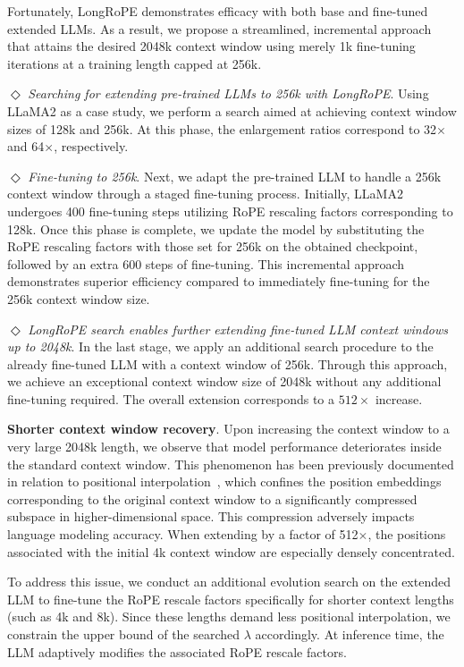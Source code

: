 Fortunately, LongRoPE demonstrates efficacy with both base and fine-tuned extended LLMs. As a result, we propose a streamlined, incremental approach that attains the desired 2048k context window using merely 1k fine-tuning iterations at a training length capped at 256k.

$\Diamond$ \textit{Searching for extending pre-trained LLMs to 256k with LongRoPE}. Using LLaMA2 as a case study, we perform a search aimed at achieving context window sizes of 128k and 256k. At this phase, the enlargement ratios correspond to 32$\times$ and 64$\times$, respectively.

$\Diamond$ \textit{Fine-tuning to 256k}. Next, we adapt the pre-trained LLM to handle a 256k context window through a staged fine-tuning process. Initially, LLaMA2 undergoes 400 fine-tuning steps utilizing RoPE rescaling factors corresponding to 128k. Once this phase is complete, we update the model by substituting the RoPE rescaling factors with those set for 256k on the obtained checkpoint, followed by an extra 600 steps of fine-tuning. This incremental approach demonstrates superior efficiency compared to immediately fine-tuning for the 256k context window size.

$\Diamond$ \textit{LongRoPE search enables further extending fine-tuned LLM context windows up to 2048k}. In the last stage, we apply an additional search procedure to the already fine-tuned LLM with a context window of 256k. Through this approach, we achieve an exceptional context window size of 2048k without any additional fine-tuning required. The overall extension corresponds to a $512\times$ increase.

\textbf{Shorter context window recovery}. Upon increasing the context window to a very large 2048k length, we observe that model performance deteriorates inside the standard context window. This phenomenon has been previously documented in relation to positional interpolation~\cite{pi}, which confines the position embeddings corresponding to the original context window to a significantly compressed subspace in higher-dimensional space. This compression adversely impacts language modeling accuracy. When extending by a factor of 512$\times$, the positions associated with the initial 4k context window are especially densely concentrated.

To address this issue, we conduct an additional evolution search on the extended LLM to fine-tune the RoPE rescale factors specifically for shorter context lengths (such as 4k and 8k). Since these lengths demand less positional interpolation, we constrain the upper bound of the searched $\lambda$ accordingly. At inference time, the LLM adaptively modifies the associated RoPE rescale factors.

